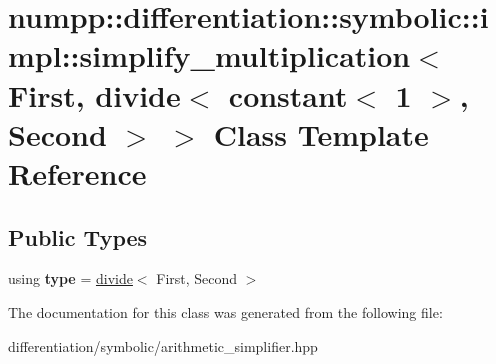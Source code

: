 \hypertarget{classnumpp_1_1differentiation_1_1symbolic_1_1impl_1_1simplify__multiplication_3_01First_00_01dive5d11c87e98ba09157b84506291511c8}{}\section{numpp\+:\+:differentiation\+:\+:symbolic\+:\+:impl\+:\+:simplify\+\_\+multiplication$<$ First, divide$<$ constant$<$ 1 $>$, Second $>$ $>$ Class Template Reference}
\label{classnumpp_1_1differentiation_1_1symbolic_1_1impl_1_1simplify__multiplication_3_01First_00_01dive5d11c87e98ba09157b84506291511c8}
\subsection*{Public Types}
\begin{DoxyCompactItemize}
\item 
\mbox{\label{classnumpp_1_1differentiation_1_1symbolic_1_1impl_1_1simplify__multiplication_3_01First_00_01dive5d11c87e98ba09157b84506291511c8_ab7b588c90b31e82d6f7724189a5e779c}} 
using {\bfseries type} = \hyperlink{classnumpp_1_1differentiation_1_1symbolic_1_1divide}{divide}$<$ First, Second $>$
\end{DoxyCompactItemize}


The documentation for this class was generated from the following file\+:\begin{DoxyCompactItemize}
\item 
differentiation/symbolic/arithmetic\+\_\+simplifier.\+hpp\end{DoxyCompactItemize}
